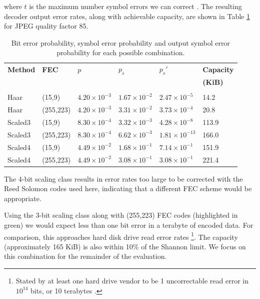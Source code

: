 where $t$ is the maximum number symbol errors we can correct \cite{rsfec-decode}. The resulting decoder output error rates, along with achievable capacity, are shown in Table \ref{tab:fec} for JPEG quality factor 85.

\begin{table}[tbph]
  \begin{center}
        \begin{tabular}{l l l l l l}
            
            \textbf{Method} & \textbf{FEC} & \textbf{$p$} & \textbf{$p_s$} & \textbf{$p_s'$} & \textbf{Capacity} \\  & &  &  &  & \textbf{(KiB)} \\[0.1ex] \hline \\ [-1.5ex]

            Haar & (15,9) & $4.20 \times 10^{-3}$ & $1.67 \times 10^{-2}$ & $2.47 \times 10^{-5}$ & 14.2 \\
            Haar &  (255,223) & $4.20 \times 10^{-3}$ & $3.31 \times 10^{-2}$ & $3.73 \times 10^{-4}$ & 20.8 \\
            Scaled3 & (15,9) & $8.30 \times 10^{-4}$ & $3.32 \times 10^{-3}$ & $4.28 \times 10^{-8}
$ & 113.9 \\
            \rowcolor{green!20!white} Scaled3 & (255,223) & $8.30 \times 10^{-4}$ & $6.62 \times 10^{-3}$ & $1.81 \times 10^{-13}
$ & 166.0 \\
            Scaled4 & (15,9) & $4.49 \times 10^{-2}$ & $1.68 \times 10^{-1}$ & $7.14 \times 10^{-1}$ & 151.9 \\
            Scaled4 & (255,223) & $4.49 \times 10^{-2}$ & $3.08 \times 10^{-1}$ & $3.08
 \times 10^{-1}$ & 221.4 \\
            
        \end{tabular}
        \caption{Bit error probability, symbol error probability and output symbol error probability for each possible combination.}
        \label{tab:fec}
    \end{center}
\end{table}

The 4-bit scaling class results in error rates too large to be corrected with the Reed Solomon codes used here, indicating that a different FEC scheme would be appropriate.

Using the 3-bit scaling class along with (255,223) FEC codes (highlighted in green) we would expect less than one bit error in a terabyte of encoded data. For comparison, this approaches hard disk drive read error rates \footnote{Stated by at least one hard drive vendor to be 1 uncorrectable read error in $10^{14}$ bits, or 10 terabytes \cite{hdd-errors}.}. The capacity (approximately 165 KiB) is also within 10\% of the Shannon limit. We focus on this combination for the remainder of the evaluation.



